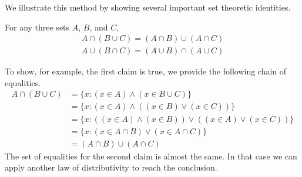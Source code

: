 We illustrate this method by showing several important set theoretic identities.

\begin{proposition}
For any three sets $A$, $B$, and $C$,
\begin{gather*}
	A \cap (B \cup C) = (A \cap B) \cup (A \cap C) \\
	A \cup (B \cap C) = (A \cup B) \cap (A \cup C)
\end{gather*}
\end{proposition}
To show, for example, the first claim is true, we provide the following chain of equalities.
\begin{align*}
	A \cap (B \cup C) &= \{x \colon (x \in A) \land (x \in B \cup C)\} \\
	&= \{x \colon (x \in A) \land ((x \in B) \lor (x \in C))\} \\
	&= \{x \colon ((x \in A) \land (x \in B)) \lor ((x \in A) \lor (x \in C))\} \\
	&= \{x \colon (x \in A \cap B) \lor (x \in A \cap C)\} \\
	&= (A \cap B) \cup (A \cap C)
\end{align*}
The set of equalities for the second claim is almost the same. In that case we can apply another law of distributivity to reach the conclusion.